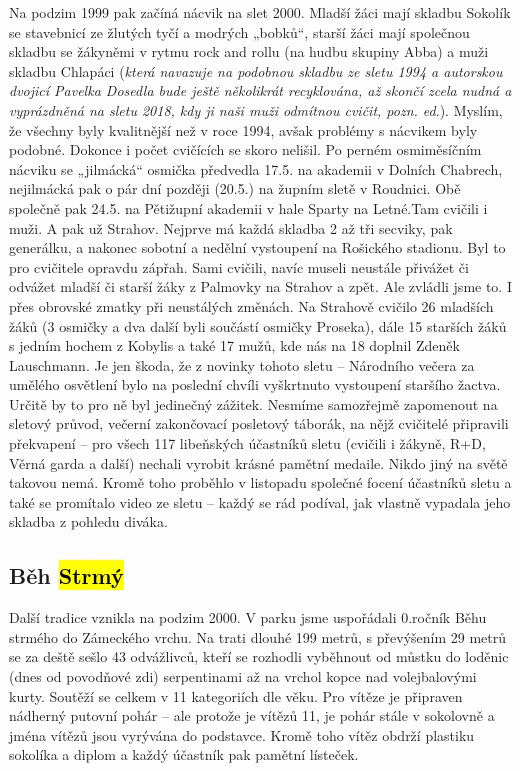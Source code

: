 Na podzim 1999 pak začíná nácvik na slet 2000. Mladší žáci mají skladbu
Sokolík se stavebnicí ze žlutých tyčí a modrých „bobků``, starší žáci
mají společnou skladbu se žákyněmi v rytmu rock and rollu (na hudbu
skupiny Abba) a muži skladbu Chlapáci (\emph{která navazuje na podobnou
skladbu ze sletu 1994 a autorskou dvojicí Pavelka Dosedla bude ještě
několikrát recyklována, až skončí zcela nudná a vyprázdněná na sletu
2018, kdy ji naši muži odmítnou cvičit, pozn. ed}.). Myslím, že všechny
byly kvalitnější než v roce 1994, avšak problémy s nácvikem byly
podobné. Dokonce i počet cvičících se skoro nelišil. Po perném
osmiměsíčním nácviku se „jilmácká`` osmička předvedla 17.5. na akademii
v Dolních Chabrech, nejilmácká pak o pár dní později (20.5.) na župním
sletě v Roudnici. Obě společně pak 24.5. na Pětižupní akademii v hale
Sparty na Letné.Tam cvičili i muži. A pak už Strahov. Nejprve má každá
skladba 2 až tři secviky, pak generálku, a nakonec sobotní a nedělní
vystoupení na Rošického stadionu. Byl to pro cvičitele opravdu zápřah.
Sami cvičili, navíc museli neustále přivážet či odvážet mladší či starší
žáky z Palmovky na Strahov a zpět. Ale zvládli jsme to. I přes obrovské
zmatky při neustálých změnách. Na Strahově cvičilo 26 mladších žáků (3
osmičky a dva další byli součástí osmičky Proseka), dále 15 starších
žáků s jedním hochem z Kobylis a také 17 mužů, kde nás na 18 doplnil
Zdeněk Lauschmann. Je jen škoda, že z novinky tohoto sletu -- Národního
večera za umělého osvětlení bylo na poslední chvíli vyškrtnuto
vystoupení staršího žactva. Určitě by to pro ně byl jedinečný zážitek.
Nesmíme samozřejmě zapomenout na sletový průvod, večerní zakončovací
posletový táborák, na nějž cvičitelé připravili překvapení -- pro všech
117 libeňských účastníků sletu (cvičili i žákyně, R+D, Věrná garda a
další) nechali vyrobit krásné pamětní medaile. Nikdo jiný na světě
takovou nemá. Kromě toho proběhlo v listopadu společné focení účastníků
sletu a také se promítalo video ze sletu -- každý se rád podíval, jak
vlastně vypadala jeho skladba z pohledu diváka.

\subsection{\texorpdfstring{Běh
\hl{Strmý}}{Běh Strmý}}\label{bux11bh-strmuxfd}

Další tradice vznikla na podzim 2000. V parku jsme uspořádali 0.ročník
Běhu strmého do Zámeckého vrchu. Na trati dlouhé 199 metrů, s převýšením
29 metrů se za deště sešlo 43 odvážlivců, kteří se rozhodli vyběhnout od
můstku do loděnic (dnes od povodňové zdi) serpentinami až na vrchol
kopce nad volejbalovými kurty. Soutěží se celkem v 11 kategoriích dle
věku. Pro vítěze je připraven nádherný putovní pohár -- ale protože je
vítězů 11, je pohár stále v sokolovně a jména vítězů jsou vyrývána do
podstavce. Kromě toho vítěz obdrží plastiku sokolíka a diplom a každý
účastník pak pamětní lísteček.

